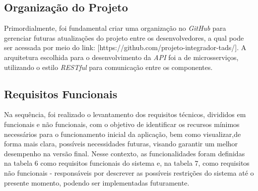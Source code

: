 \subsection{Organização do Projeto}

Primordialmente, foi fundamental criar uma organização no \textit{ GitHub} para gerenciar futuras atualizações do projeto entre os desenvolvedores, a qual pode ser acessada por meio do link: [https://github.com/projeto-integrador-tads/]. A arquitetura escolhida para o desenvolvimento da \textit{API} foi a de microsserviços, utilizando o estilo \textit{RESTful} para comunicação entre os componentes. 

\subsection{Requisitos Funcionais}

Na sequência, foi realizado o levantamento dos requisitos técnicos, divididos em funcionais e não funcionais, com o objetivo de identificar os recursos mínimos necessários para o funcionamento inicial da aplicação, bem como visualizar,de forma mais clara, possíveis necessidades futuras, visando garantir um melhor desempenho na versão final. Nesse contexto, as funcionalidades foram definidas na tabela 6 como requisitos funcionais do sistema e, na tabela 7, como requisitos não funcionais - responsáveis por descrever as possíveis restrições do sistema até o presente momento, podendo ser implementadas futuramente.


